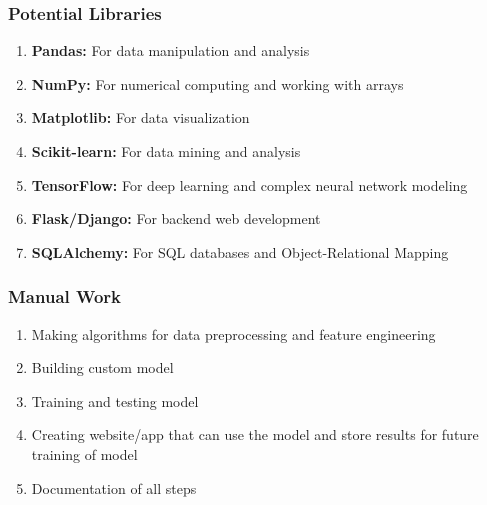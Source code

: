 \documentclass{notes}
\begin{document}
\subsubsection{Potential Libraries}
\begin{enumerate}
    \item \textbf{Pandas:} For data manipulation and analysis
    \item \textbf{NumPy:} For numerical computing and working with arrays
    \item \textbf{Matplotlib:} For data visualization
    \item \textbf{Scikit-learn:} For data mining and analysis
    \item \textbf{TensorFlow:} For deep learning and complex neural network modeling
    \item \textbf{Flask/Django:} For backend web development
    \item \textbf{SQLAlchemy:} For SQL databases and Object-Relational Mapping
\end{enumerate}

\subsubsection{Manual Work}
\begin{enumerate}
    \item Making algorithms for data preprocessing and feature engineering
    \item Building custom model
    \item Training and testing model
    \item Creating website/app that can use the model and store results for future training of model
    \item Documentation of all steps
\end{enumerate}
\end{document}
